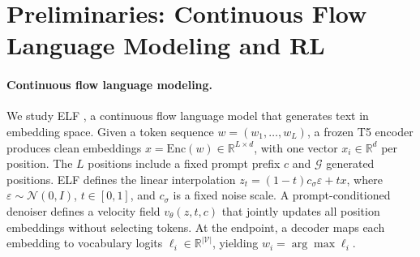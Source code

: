 \section{Preliminaries: Continuous Flow Language Modeling and RL}
\label{sec:estimators}

\paragraph{Continuous flow language modeling.}
We study ELF \citep{hu2026elf}, a continuous flow language model that generates text in embedding space. Given a token sequence $w=(w_1,\dots,w_L)$, a frozen T5 encoder \citep{raffel2020t5} produces clean embeddings $x=\mathrm{Enc}(w)\in\mathbb R^{L\times d}$, with one vector $x_i\in\mathbb R^d$ per position. The $L$ positions include a fixed prompt prefix $c$ and $\mathcal G$ generated positions. ELF defines the linear interpolation $z_t=(1-t)c_\sigma\varepsilon+t x$, where $\varepsilon\sim\mathcal N(0,I)$, $t\in[0,1]$, and $c_\sigma$ is a fixed noise scale. A prompt-conditioned denoiser defines a velocity field $v_\theta(z,t,c)$ that jointly updates all position embeddings without selecting tokens. At the endpoint, a decoder maps each embedding to vocabulary logits $\ell_i\in\mathbb R^{|\mathcal V|}$, yielding $w_i=\arg\max\ell_i$. 


